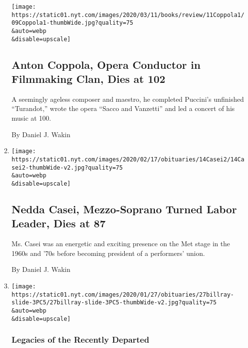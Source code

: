 \begin{enumerate}
  \texttt{[image: https://static01.nyt.com/images/2020/03/11/books/review/11Coppola1/09Coppola1-thumbWide.jpg?quality=75\\\&auto=webp\\\&disable=upscale]}

  \hypertarget{anton-coppola-opera-conductor-in-filmmaking-clan-dies-at-102}{%
  \subsection{Anton Coppola, Opera Conductor in Filmmaking Clan, Dies at
  102}\label{anton-coppola-opera-conductor-in-filmmaking-clan-dies-at-102}}

  A seemingly ageless composer and maestro, he completed Puccini's
  unfinished ``Turandot,'' wrote the opera ``Sacco and Vanzetti'' and
  led a concert of his music at 100.

  By Daniel J. Wakin
\item
  \href{/2020/02/15/arts/music/nedda-casei-dead.html}{}

  \texttt{[image: https://static01.nyt.com/images/2020/02/17/obituaries/14Casei2/14Casei2-thumbWide-v2.jpg?quality=75\\\&auto=webp\\\&disable=upscale]}

  \hypertarget{nedda-casei-mezzo-soprano-turned-labor-leader-dies-at-87}{%
  \subsection{Nedda Casei, Mezzo-Soprano Turned Labor Leader, Dies at
  87}\label{nedda-casei-mezzo-soprano-turned-labor-leader-dies-at-87}}

  Ms. Casei was an energetic and exciting presence on the Met stage in
  the 1960s and '70s before becoming president of a performers' union.

  By Daniel J. Wakin
\item
  \href{/2020/02/10/arts/what-they-left-behind-hairspray-posters-and-a-city-of-sketches.html}{}

  \texttt{[image: https://static01.nyt.com/images/2020/01/27/obituaries/27billray-slide-3PC5/27billray-slide-3PC5-thumbWide-v2.jpg?quality=75\\\&auto=webp\\\&disable=upscale]}

  \hypertarget{legacies-of-the-recently-departed}{%
  \subsubsection{Legacies of the Recently
  Departed}\label{legacies-of-the-recently-departed}}

  \hypertarget{what-they-left-behind-hairspray-posters-and-a-city-of-sketches}{%
}
\end{enumerate}
